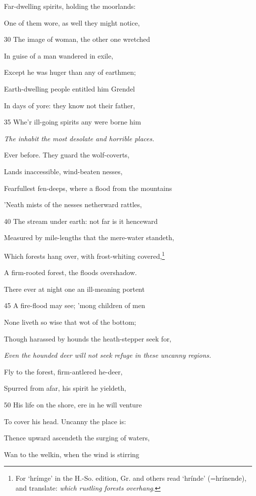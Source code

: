 Far-dwelling spirits, holding the moorlands:

One of them wore, as well they might notice,

30
The image of woman, the other one wretched

In guise of a man wandered in exile,

Except he was huger than any of earthmen;

Earth-dwelling people entitled him Grendel

In days of yore: they know not their father,

35
Whe’r ill-going spirits any were borne him

\emph{The inhabit the
most desolate and
horrible places.}

Ever before. They guard the wolf-coverts,

Lands inaccessible, wind-beaten nesses,

Fearfullest fen-deeps, where a flood from the mountains

’Neath mists of the nesses netherward rattles,

40
The stream under earth: not far is it henceward

Measured by mile-lengths that the mere-water standeth,

Which forests hang over, with frost-whiting covered,\footnote{For ‘hrímge’ in the H.-So. edition, Gr. and others read ‘hrínde’
(=hrínende), and translate: \emph{which rustling forests overhang}.}

A firm-rooted forest, the floods overshadow.

There ever at night one an ill-meaning portent

45
A fire-flood may see; ’mong children of men

None liveth so wise that wot of the bottom;

Though harassed by hounds the heath-stepper seek for,

\emph{Even the hounded
deer will not seek
refuge in these uncanny
regions.}

Fly to the forest, firm-antlered he-deer,

Spurred from afar, his spirit he yieldeth,

50
His life on the shore, ere in he will venture

To cover his head. Uncanny the place is:

Thence upward ascendeth the surging of waters,

Wan to the welkin, when the wind is stirring

